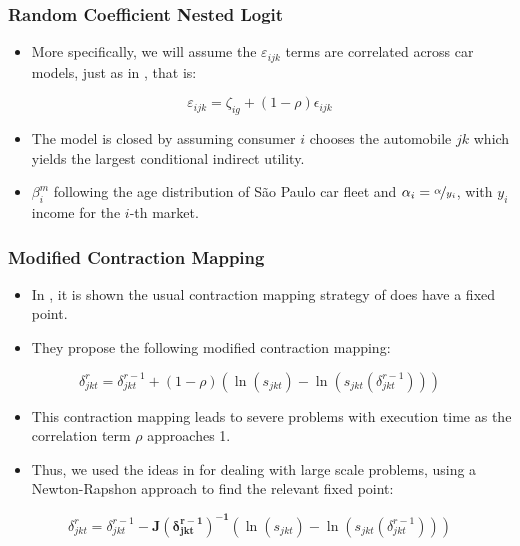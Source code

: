 \documentclass{beamer}
\begin{document}
\begin{frame}[fragile]\frametitle{Random Coefficient Nested Logit}
\begin{itemize}
    \item More specifically, we will assume the $\varepsilon_{ijk}$ terms are correlated across car models, just as in \citet{Grigolon_Verboven}, that is:
\end{itemize}    

\begin{equation}
\varepsilon_{ijk}=\zeta_{ig}+(1-\rho)\epsilon_{ijk}
\end{equation}

\begin{itemize}
    \item The model is closed by assuming consumer $i$ chooses the automobile $jk$ which yields the largest conditional indirect utility. 
    \item $\beta_{i}^{m}$ following the age distribution of São Paulo car fleet and $\alpha_{i}=\nicefrac{\alpha}{y_{i}}$, with $y_{i}$ income for the $i$-th market.
\end{itemize}
\end{frame}


\begin{frame}[fragile]\frametitle{Modified Contraction Mapping}

\begin{itemize}
    \item In \citet{Grigolon_Verboven}, it is shown the usual contraction mapping strategy of \citet{Berry1995} does have a fixed point. 
    \item They propose the following modified contraction mapping:
\end{itemize}

\begin{equation}
\delta_{jkt}^{r}=\delta_{jkt}^{r-1}+(1-\rho)(\ln(s_{jkt})-\ln(s_{jkt}(\delta_{jkt}^{r-1})))
\end{equation}

\begin{itemize}
   \item This contraction mapping leads to severe problems with execution time as the correlation term $\rho$ approaches 1. 
   \item Thus, we used the ideas in \citet{Reynaerts2012} for dealing with large scale problems, using a Newton-Rapshon approach to find the relevant fixed point:
\end{itemize}    

\begin{equation}
\delta_{jkt}^{r}=\delta_{jkt}^{r-1}-\mathbf{J(\delta_{jkt}^{r-1})^{-1}}(\ln(s_{jkt})-\ln(s_{jkt}(\delta_{jkt}^{r-1})))
\end{equation}


\end{frame}
\end{document}
